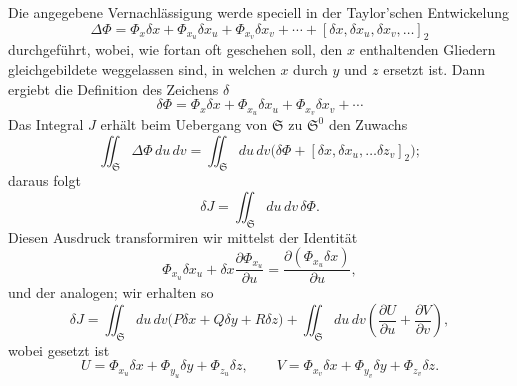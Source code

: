 \documentclass[11pt,a4paper,leqno]{article}
\begin{document}
Die angegebene Vernachlässigung werde speciell in der
Taylor'schen Entwickelung
\[
\Delta\Phi=\Phi_x\delta x+\Phi_{x_u}\delta x_u+\Phi_{x_v}\delta x_v
+\cdots+[\delta x,\delta x_u,\delta x_v,\ldots]_2
\]
durchgeführt, wobei, wie fortan oft geschehen soll, den $x$ enthaltenden
Gliedern gleichgebildete weggelassen sind, in welchen
$x$ durch $y$ und $z$ ersetzt ist. Dann ergiebt die Definition des
Zeichens $\delta$
\[
\delta\Phi=\Phi_x\delta x+\Phi_{x_u}\delta x_u+\Phi_{x_v}\delta x_v+\cdots
\]
Das Integral $J$ erhält beim Uebergang von $\mathfrak{S}$ zu $\mathfrak{S}^0$ den Zuwachs
\[
\iint_{\mathfrak{S}}\Delta\Phi\,du\,dv
=\iint_{\mathfrak{S}}du\,dv
\bigl(\delta\Phi+[\delta x,\delta x_u,\ldots\delta z_v]_2\bigr);
\]
daraus folgt
\[
\delta J=\iint_{\mathfrak{S}}du\,dv\,\delta\Phi.
\]
Diesen Ausdruck transformiren wir mittelst der Identität
\[
\Phi_{x_u}\delta x_u
+\delta x\frac{\partial\Phi_{x_u}}{\partial u}
=\frac{\partial(\Phi_{x_u}\delta x)}{\partial u},
\]
und der analogen; wir erhalten so
\[
\delta J=\iint_{\mathfrak{S}}du\,dv
\bigl(P\delta x+Q\delta y+R\delta z\bigr)
+\iint_{\mathfrak{S}}du\,dv
\left(\frac{\partial U}{\partial u}+\frac{\partial V}{\partial v}\right),
\]
wobei gesetzt ist
\[
U=\Phi_{x_u}\delta x+\Phi_{y_u}\delta y+\Phi_{z_u}\delta z,
\qquad
V=\Phi_{x_v}\delta x+\Phi_{y_v}\delta y+\Phi_{z_v}\delta z.
\]
\end{document}

